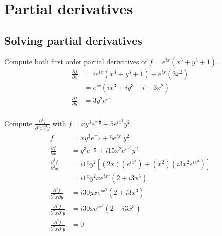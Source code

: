 \section{Partial derivatives}

  \subsection{Solving partial derivatives}
  Compute both first order partial derivatives of $f = e^{ix}(x^3 + y^3 + 1)$.
  \begin{align*}
    \frac{\partial f}{\partial x} & = ie^{ix}(x^3 + y^3 + 1) + e^{ix}(3x^2) \\
                                  & = e^{ix}(ix^3 + iy^3 + i + 3x^2) \\
    \frac{\partial f}{\partial y} & = 3y^2e^{ix} \\
  \end{align*}

  Compute $\frac{\partial^5f}{\partial^2x\partial^3y}$ with $f = xy^3e^{-\frac{1}{y}} + 5e^{ix^3}y^2$.
  \begin{align*}
    f                                           & = xy^3e^{-\frac{1}{y}} + 5e^{ix^3}y^2 \\
    \frac{\partial f}{\partial x}               & = y^3e^{-\frac{1}{y}} + i15x^2e^{ix^3}y^2\\
    \frac{\partial^2f}{\partial^2x}             & = i15y^2[(2x)(e^{ix^3}) + (x^2)(i3x^2e^{ix^3})]\\
                                                & = i15y^2xe^{ix^3}(2 + i3x^3)\\
    \frac{\partial^3f}{\partial^2x\partial y}   & = i30yxe^{ix^3}(2 + i3x^3) \\
    \frac{\partial^4f}{\partial^2x\partial^2y}  & = i30xe^{ix^3}(2 + i3x^3) \\
    \frac{\partial^5f}{\partial^2x\partial^3y}  & = 0 \\
  \end{align*}